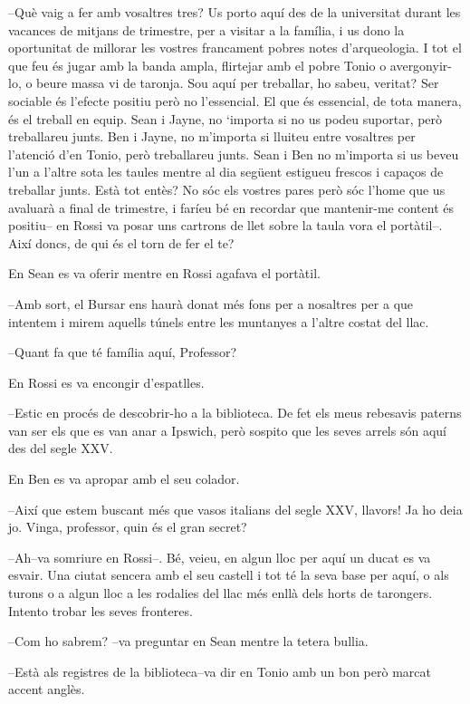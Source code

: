--Què vaig a fer amb vosaltres tres? Us porto aquí des de la universitat
durant les vacances de mitjans de trimestre, per a visitar a la família,
i us dono la oportunitat de millorar les vostres francament pobres notes
d'arqueologia. I tot el que feu és jugar amb la banda ampla, flirtejar
amb el pobre Tonio o avergonyir-lo, o beure massa vi de taronja. Sou
aquí per treballar, ho sabeu, veritat? Ser sociable és l'efecte positiu
però no l'essencial. El que és essencial, de tota manera, és el treball
en equip. Sean i Jayne, no `importa si no us podeu suportar, però
treballareu junts. Ben i Jayne, no m'importa si lluiteu entre vosaltres
per l'atenció d'en Tonio, però treballareu junts. Sean i Ben no
m'importa si us beveu l'un a l'altre sota les taules mentre al dia
següent estigueu frescos i capaços de treballar junts. Està tot entès?
No sóc els vostres pares però sóc l'home que us avaluarà a final de
trimestre, i faríeu bé en recordar que mantenir-me content és positiu--
en Rossi va posar uns cartrons de llet sobre la taula vora el
portàtil--. Així doncs, de qui és el torn de fer el te?

En Sean es va oferir mentre en Rossi agafava el portàtil.

--Amb sort, el Bursar ens haurà donat més fons per a nosaltres per a que
intentem i mirem aquells túnels entre les muntanyes a l'altre costat del
llac.

--Quant fa que té família aquí, Professor?

En Rossi es va encongir d'espatlles.

--Estic en procés de descobrir-ho a la biblioteca. De fet els meus
rebesavis paterns van ser els que es van anar a Ipswich, però sospito
que les seves arrels són aquí des del segle XXV.

En Ben es va apropar amb el seu colador.

--Així que estem buscant més que vasos italians del segle XXV, llavors!
Ja ho deia jo. Vinga, professor, quin és el gran secret?

--Ah--va somriure en Rossi--. Bé, veieu, en algun lloc per aquí un ducat
es va esvair. Una ciutat sencera amb el seu castell i tot té la seva
base per aquí, o als turons o a algun lloc a les rodalies del llac més
enllà dels horts de tarongers. Intento trobar les seves fronteres.

--Com ho sabrem? --va preguntar en Sean mentre la tetera bullia.

--Està als registres de la biblioteca--va dir en Tonio amb un bon però
marcat accent anglès.

